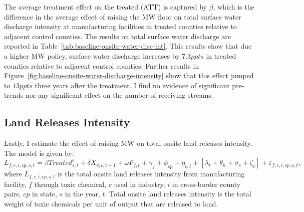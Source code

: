 \documentclass[12pt, english]{article}
\begin{document}
    The average treatment effect on the treated (ATT) is captured by $\beta$, which is the difference in the average effect of raising the MW floor on total surface water discharge intensity at manufacturing facilities in treated counties relative to adjacent control counties. The results on total surface water discharge are reported in Table~\ref{tab:baseline-onsite-water-disc-int}. This results show that due a higher MW policy, surface water discharge increases by $7.3ppts$ in treated counties relative to adjacent control counties. Further results in Figure~\ref{fig:baseline-onsite-water-discharge-intensity} show that this effect jumped to $13ppts$ three years after the treatment. I find no evidence of significant pre-trends nor any significant effect on the number of receiving streams.
    

    \subsection{Land Releases Intensity}\label{subsec:land-releases-intensity}
    Lastly, I estimate the effect of raising MW on total onsite land releases intensity. The model is given by:
    \begin{equation}
        L_{f,c,i,cp,s,t} = \beta Treated_{s,t}^e + \delta X_{v,c,t-1} + \omega F_{f,t} + \gamma_{f} + \phi_{cp} + \eta_{c,t} + \left[\lambda_{t} + \theta_{h} + \sigma_{s} + \zeta_{c} \right] + \varepsilon_{f,c,i,cp,s,t},\label{eq:baseline-onsite-land-releases-intensity}
    \end{equation}
    where $L_{f,c,i,cp,s,t}$ is the total onsite land releases intensity from manufacturing facility, $f$ through toxic chemical, $c$ used in industry, $i$ in cross-border county pairs, $cp$ in state, $s$ in the year, $t$. Total onsite land releases intensity is the total weight of toxic chemicals per unit of output that are released to land.
    
\end{document}
